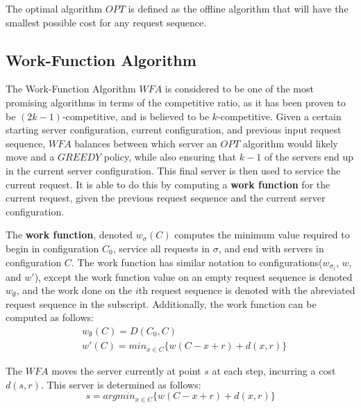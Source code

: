 \begin{definition}
    The optimal algorithm $OPT$ is defined as the offline algorithm that will have the smallest possible cost for any request sequence.
\end{definition}

\subsection{Work-Function Algorithm}
\label{sec:WFA}
The Work-Function Algorithm $WFA$ is considered to be one of the most promising algorithms in terms of the competitive ratio, as it has been proven to be $(2k-1)$-competitive, and is believed to be $k$-competitive. Given a certain starting server configuration, current configuration, and previous input request sequence, $WFA$ balances between which server an $OPT$ algorithm would likely move and a $GREEDY$ policy, while also ensuring that $k-1$ of the servers end up in the current server configuration. This final server is then used to service the current request. It is able to do this by computing a \textbf{work function} for the current request, given the previous request sequence and the current server configuration.

\begin{definition}
    The \textbf{work function}, denoted $w_\sigma(C)$ computes the minimum value required to begin in configuration $C_0$, service all requests in $\sigma$, and end with servers in configuration $C$. The work function has similar notation to configurations($w_{\sigma_i}$, $w$, and $w'$), except the work function value on an empty request sequence is denoted $w_\emptyset$, and the work done on the $i$th request sequence is denoted with the abreviated request sequence in the subscript. Additionally, the work function can be computed as follows:
    \begin{equation*}
        \begin{split}
            &w_\emptyset(C) = D(C_0, C) \\
            &w'(C) = min_{x \in C} \{ w(C - x + r) + d(x, r)\}
        \end{split}
    \end{equation*}
\end{definition}

\begin{definition}
    The $WFA$ moves the server currently at point $s$ at each step, incurring a cost $d(s,r)$. This server is determined as follows:
    \begin{equation*}
        s = argmin_{x \in C} \{ w(C-x+r) + d(x,r)\}
    \end{equation*}
\end{definition}

